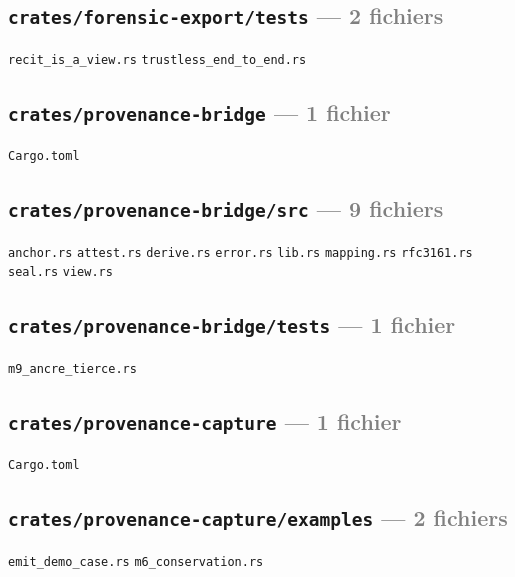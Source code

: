 \documentclass[10pt]{report}
\newcommand{\code}[1]{\texttt{\small #1}}
\begin{document}
\subsection*{\code{crates/forensic-export/tests} \normalfont\textcolor{grey}{--- 2 fichiers}}
\begin{sloppypar}\footnotesize\raggedright
\code{recit\_is\_a\_view.rs} \;\textbullet\; \code{trustless\_end\_to\_end.rs}
\end{sloppypar}

\subsection*{\code{crates/provenance-bridge} \normalfont\textcolor{grey}{--- 1 fichier}}
\begin{sloppypar}\footnotesize\raggedright
\code{Cargo.toml}
\end{sloppypar}

\subsection*{\code{crates/provenance-bridge/src} \normalfont\textcolor{grey}{--- 9 fichiers}}
\begin{sloppypar}\footnotesize\raggedright
\code{anchor.rs} \;\textbullet\; \code{attest.rs} \;\textbullet\; \code{derive.rs} \;\textbullet\; \code{error.rs} \;\textbullet\; \code{lib.rs} \;\textbullet\; \code{mapping.rs} \;\textbullet\; \code{rfc3161.rs} \;\textbullet\; \code{seal.rs} \;\textbullet\; \code{view.rs}
\end{sloppypar}

\subsection*{\code{crates/provenance-bridge/tests} \normalfont\textcolor{grey}{--- 1 fichier}}
\begin{sloppypar}\footnotesize\raggedright
\code{m9\_ancre\_tierce.rs}
\end{sloppypar}

\subsection*{\code{crates/provenance-capture} \normalfont\textcolor{grey}{--- 1 fichier}}
\begin{sloppypar}\footnotesize\raggedright
\code{Cargo.toml}
\end{sloppypar}

\subsection*{\code{crates/provenance-capture/examples} \normalfont\textcolor{grey}{--- 2 fichiers}}
\begin{sloppypar}\footnotesize\raggedright
\code{emit\_demo\_case.rs} \;\textbullet\; \code{m6\_conservation.rs}
\end{sloppypar}
\end{document}

